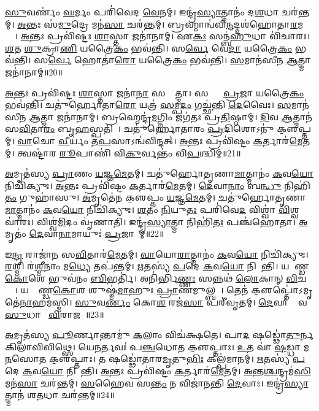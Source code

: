 \ul{𑌸𑍁}𑌵𑌰𑍍𑌣𑌂॑ \ul{𑌘}𑌰𑍍𑌮𑌂 𑌪𑌰𑌿॑𑌵𑍇𑌦 \ul{𑌵𑍇}𑌨𑌮𑍍। 
𑌇𑌨𑍍𑌦𑍍𑌰॑\ul{𑌸𑍍𑌯𑌾}𑌤𑍍𑌮𑌾𑌨𑌂॑ 𑌦\ul{𑌶}𑌧𑌾 𑌚𑌰॑𑌨𑍍𑌤𑌮𑍍। 
\ul{𑌅}𑌨𑍍𑌤𑌃 𑌸॑\ul{𑌮𑍁}𑌦𑍍𑌰𑍇 𑌮𑌨॑\ul{𑌸𑌾} 𑌚𑌰॑𑌨𑍍𑌤𑌮𑍍। 
𑌬𑍍𑌰𑌹𑍍𑌮𑌾𑌨𑍍𑌵॑𑌵𑌿\ul{𑌨𑍍𑌦}𑌦𑍍𑌦𑌶॑𑌹𑍋𑌤𑌾\ul{𑌰}𑌮𑌰𑍍𑌣𑍇᳚। 
\ul{𑌅}𑌨𑍍𑌤𑌃 𑌪𑍍𑌰𑌵𑌿॑𑌷𑍍𑌟𑌃  \ul{𑌶𑌾}𑌸𑍍𑌤𑌾 𑌜𑌨𑌾॑𑌨𑌾𑌮𑍍। 
𑌏\ul{𑌕𑌃} 𑌸𑌨𑍍𑌬॑\ul{𑌹𑍁}𑌧𑌾 𑌵𑌿॑𑌚𑌾𑌰𑌃। 
\ul{𑌶}𑌤 \ul{𑌶𑍁}𑌕𑍍𑌰𑌾\ul{𑌣𑌿} 𑌯𑌤𑍍𑌰𑍈\ul{𑌕𑌂} 𑌭𑌵॑𑌨𑍍𑌤𑌿। 
𑌸\ul{𑌰𑍍𑌵𑍇} 𑌵𑍇\ul{𑌦𑌾} 𑌯𑌤𑍍𑌰𑍈\ul{𑌕𑌂} 𑌭𑌵॑𑌨𑍍𑌤𑌿। 
𑌸\ul{𑌰𑍍𑌵𑍇} 𑌹𑍋𑌤𑌾॑\ul{𑌰𑍋} 𑌯𑌤𑍍𑌰𑍈\ul{𑌕𑌂} 𑌭𑌵॑𑌨𑍍𑌤𑌿। 
\ul{𑌸}𑌮𑌾𑌨॑𑌸𑍀𑌨 \ul{𑌆}𑌤𑍍𑌮𑌾 𑌜𑌨𑌾॑𑌨𑌾𑌮𑍍॥20॥%

\ul{𑌅}𑌨𑍍𑌤𑌃 𑌪𑍍𑌰𑌵𑌿॑𑌷𑍍𑌟𑌃  \ul{𑌶𑌾}𑌸𑍍𑌤𑌾 𑌜𑌨𑌾॑\ul{𑌨𑌾}\ul{} 𑌸𑌰𑍍𑌵𑌾᳚𑌤𑍍𑌮𑌾। 
𑌸𑌰𑍍𑌵𑌾𑌃᳚ \ul{𑌪𑍍𑌰}𑌜𑌾 𑌯𑌤𑍍𑌰𑍈\ul{𑌕𑌂} 𑌭𑌵॑𑌨𑍍𑌤𑌿। 
𑌚𑌤𑍁॑𑌰𑍍\mbox{}𑌹𑍋𑌤𑌾\ul{𑌰𑍋} 𑌯𑌤𑍍𑌰॑ \ul{𑌸}𑌮𑍍𑌪\ul{𑌦𑌂} 𑌗𑌚𑍍𑌛॑𑌨𑍍𑌤𑌿 \ul{𑌦𑍇}𑌵𑍈𑌃। 
\ul{𑌸}𑌮𑌾𑌨॑𑌸𑍀𑌨 \ul{𑌆}𑌤𑍍𑌮𑌾 𑌜𑌨𑌾॑𑌨𑌾𑌮𑍍। 
𑌬𑍍𑌰𑌹𑍍𑌮𑍇𑌨𑍍𑌦𑍍𑌰॑\ul{𑌮}𑌗𑍍𑌨𑌿𑌂 𑌜𑌗॑𑌤𑌃 𑌪𑍍𑌰\ul{𑌤𑌿}𑌷𑍍𑌠𑌾𑌮𑍍। 
\ul{𑌦𑌿}𑌵 \ul{𑌆}𑌤𑍍𑌮𑌾𑌨॑ 𑌸\ul{𑌵𑌿}𑌤𑌾\ul{𑌰𑌂} 𑌬𑍃\ul{𑌹}𑌸𑍍𑌪𑌤𑌿𑌮𑍍᳚। 
𑌚𑌤𑍁॑𑌰𑍍\mbox{}𑌹𑍋𑌤𑌾𑌰𑌂 \ul{𑌪𑍍𑌰}𑌦𑌿𑌶𑍋𑌽𑌨𑍁॑ 𑌕𑍢॒𑌪𑍍𑌤𑌮𑍍। 
\ul{𑌵𑌾}𑌚𑍋 \ul{𑌵𑍀}𑌰𑍍𑌯𑌂॑ 𑌤\ul{𑌪}𑌸𑌾𑌽𑌨𑍍𑌵॑𑌵𑌿𑌨𑍍𑌦𑌤𑍍। 
\ul{𑌅}𑌨𑍍𑌤𑌃 𑌪𑍍𑌰𑌵𑌿॑𑌷𑍍𑌟𑌂 \ul{𑌕}𑌰𑍍𑌤𑌾𑌰॑\ul{𑌮𑍇}𑌤𑌮𑍍। 
𑌤𑍍𑌵𑌷𑍍𑌟𑌾॑𑌰 \ul{𑌰𑍂}𑌪𑌾𑌣𑌿॑ 𑌵𑌿\ul{𑌕𑍁}𑌰𑍍𑌵𑌨𑍍𑌤𑌂॑ 𑌵𑌿\ul{𑌪}𑌶𑍍𑌚𑌿𑌮𑍍॥21॥

\ul{𑌅}𑌮𑍃𑌤॑𑌸𑍍𑌯 \ul{𑌪𑍍𑌰𑌾}𑌣𑌂 \ul{𑌯}𑌜𑍍𑌞\ul{𑌮𑍇}𑌤𑌮𑍍। 
𑌚𑌤𑍁॑𑌰𑍍\mbox{}𑌹𑍋𑌤𑍃𑌣𑌾\ul{𑌮𑌾}𑌤𑍍𑌮𑌾𑌨𑌂॑ \ul{𑌕}𑌵\ul{𑌯𑍋} 𑌨𑌿𑌚𑌿॑𑌕𑍍𑌯𑍁𑌃। 
\ul{𑌅}𑌨𑍍𑌤𑌃 𑌪𑍍𑌰𑌵𑌿॑𑌷𑍍𑌟𑌂 \ul{𑌕}𑌰𑍍𑌤𑌾𑌰॑\ul{𑌮𑍇}𑌤𑌮𑍍। 
\ul{𑌦𑍇}𑌵𑌾\ul{𑌨𑌾𑌂} 𑌬\ul{𑌨𑍍𑌧𑍁} 𑌨𑌿𑌹𑌿॑\ul{𑌤𑌂} 𑌗𑍁𑌹𑌾॑𑌸𑍁। 
\ul{𑌅}𑌮𑍃𑌤𑍇॑𑌨 𑌕𑍢॒𑌪𑍍𑌤𑌂 \ul{𑌯}𑌜𑍍𑌞\ul{𑌮𑍇}𑌤𑌮𑍍। 
𑌚𑌤𑍁॑𑌰𑍍\mbox{}𑌹𑍋𑌤𑍃𑌣𑌾\ul{𑌮𑌾}𑌤𑍍𑌮𑌾𑌨𑌂॑ \ul{𑌕}𑌵\ul{𑌯𑍋} 𑌨𑌿𑌚𑌿॑𑌕𑍍𑌯𑍁𑌃। 
\ul{𑌶}𑌤𑌂 \ul{𑌨𑌿}𑌯𑍁\ul{𑌤𑌃} 𑌪𑌰𑌿॑𑌵𑍇\ul{𑌦} 𑌵𑌿𑌶𑍍𑌵𑌾॑ \ul{𑌵𑌿}𑌶𑍍𑌵𑌵𑌾॑𑌰𑌃। 
𑌵𑌿𑌶𑍍𑌵॑\ul{𑌮𑌿}𑌦𑌂 𑌵𑍃॑𑌣𑌾𑌤𑌿। 
𑌇𑌨𑍍𑌦𑍍𑌰॑\ul{𑌸𑍍𑌯𑌾}𑌤𑍍𑌮𑌾 𑌨𑌿𑌹𑌿॑\ul{𑌤𑌃} 𑌪𑌞𑍍𑌚॑𑌹𑍋𑌤𑌾। 
\ul{𑌅}𑌮𑍃𑌤𑌂॑ \ul{𑌦𑍇}𑌵𑌾\ul{𑌨𑌾}𑌮𑌾𑌯𑍁𑌃॑ \ul{𑌪𑍍𑌰}𑌜𑌾𑌨𑌾᳚𑌮𑍍॥22॥%

𑌇\ul{𑌨𑍍𑌦𑍍𑌰}\ul{} 𑌰𑌾𑌜𑌾॑𑌨 𑌸\ul{𑌵𑌿}𑌤𑌾𑌰॑\ul{𑌮𑍇}𑌤𑌮𑍍। 
\ul{𑌵𑌾}𑌯𑍋\ul{𑌰𑌾}𑌤𑍍𑌮𑌾𑌨𑌂॑ \ul{𑌕}𑌵\ul{𑌯𑍋} 𑌨𑌿𑌚𑌿॑𑌕𑍍𑌯𑍁𑌃। 
\ul{𑌰}𑌶𑍍𑌮𑌿 𑌰॑\ul{𑌶𑍍𑌮𑍀}𑌨𑌾𑌂 𑌮\ul{𑌧𑍍𑌯𑍇} 𑌤𑌪॑𑌨𑍍𑌤𑌮𑍍। 
\ul{𑌋}𑌤𑌸𑍍𑌯॑ \ul{𑌪}𑌦𑍇 \ul{𑌕}𑌵\ul{𑌯𑍋} 𑌨𑌿𑌪𑌾᳚𑌨𑍍𑌤𑌿। 
𑌯 𑌆᳚𑌣𑍍𑌡\ul{𑌕𑍋}𑌶𑍇 𑌭𑍁𑌵॑𑌨𑌂 \ul{𑌬𑌿}𑌭𑌰𑍍𑌤𑌿॑। 
𑌅𑌨𑌿॑𑌰𑍍𑌭𑌿\ul{𑌣𑍍𑌣𑌃} 𑌸𑌨𑍍𑌨𑌥॑ \ul{𑌲𑍋}𑌕𑌾𑌨𑍍 \ul{𑌵𑌿}𑌚𑌷𑍍𑌟𑍇᳚। 
𑌯𑌸𑍍𑌯𑌾᳚𑌣𑍍𑌡\ul{𑌕𑍋}𑌶 𑌶𑍁𑌷𑍍𑌮॑\ul{𑌮𑌾}𑌹𑍁𑌃 \ul{𑌪𑍍𑌰𑌾}𑌣𑌮𑍁𑌲𑍍𑌬𑌮𑍍᳚। 
𑌤𑍇𑌨॑ 𑌕𑍢॒𑌪𑍍𑌤𑍋॑𑌽𑌮𑍃𑌤𑍇॑\ul{𑌨𑌾}𑌹𑌮॑𑌸𑍍𑌮𑌿। 
\ul{𑌸𑍁}𑌵\ul{𑌰𑍍𑌣𑌂} 𑌕𑍋\ul{𑌶}\ul{} 𑌰𑌜॑\ul{𑌸𑌾} 𑌪𑌰𑍀॑𑌵𑍃𑌤𑌮𑍍। 
\ul{𑌦𑍇}𑌵𑌾𑌨𑌾𑌂᳚ 𑌵\ul{𑌸𑍁}𑌧𑌾𑌨𑍀𑌂᳚  \ul{𑌵𑌿}𑌰𑌾𑌜𑌮𑍍᳚॥23॥%

\ul{𑌅}𑌮𑍃𑌤॑𑌸𑍍𑌯 \ul{𑌪𑍂}𑌰𑍍𑌣𑌾𑌨𑍍𑌤𑌾𑌮𑍁॑ \ul{𑌕}𑌲𑌾𑌂  𑌵𑌿𑌚॑𑌕𑍍𑌷𑌤𑍇। 
𑌪𑌾\ul{𑌦}\ul{} 𑌷𑌡𑍍𑌢𑍋॑\ul{𑌤𑍁}𑌰𑍍𑌨 𑌕𑌿𑌲𑌾॑𑌵𑌿𑌵𑌿𑌥𑍍𑌸𑍇। 
𑌯𑍇\ul{𑌨}𑌰𑍍𑌤𑌵𑌃॑ 𑌪\ul{𑌞𑍍𑌚}𑌧𑍋𑌤 𑌕𑍢॒𑌪𑍍𑌤𑌾𑌃। 
\ul{𑌉}𑌤 𑌵𑌾॑ \ul{𑌷}𑌡𑍍𑌧𑌾 𑌮\ul{𑌨}𑌸𑍋𑌤 𑌕𑍢॒𑌪𑍍𑌤𑌾𑌃। 
𑌤 𑌷𑌡𑍍𑌢𑍋॑𑌤𑌾𑌰\ul{𑌮𑍃}𑌤𑍁\ul{𑌭𑌿𑌃} 𑌕𑌲𑍍𑌪॑𑌮𑌾𑌨𑌮𑍍। 
\ul{𑌋}𑌤𑌸𑍍𑌯॑ \ul{𑌪}𑌦𑍇 \ul{𑌕}𑌵\ul{𑌯𑍋} 𑌨𑌿𑌪𑌾᳚𑌨𑍍𑌤𑌿। 
\ul{𑌅}𑌨𑍍𑌤𑌃 𑌪𑍍𑌰𑌵𑌿॑𑌷𑍍𑌟𑌂 \ul{𑌕}𑌰𑍍𑌤𑌾𑌰॑\ul{𑌮𑍇}𑌤𑌮𑍍। 
\ul{𑌅}𑌨𑍍𑌤\ul{𑌶𑍍𑌚}𑌨𑍍𑌦𑍍𑌰𑌮॑\ul{𑌸𑌿} 𑌮𑌨॑\ul{𑌸𑌾} 𑌚𑌰॑𑌨𑍍𑌤𑌮𑍍। 
\ul{𑌸}𑌹𑍈𑌵 𑌸\ul{𑌨𑍍𑌤𑌂} 𑌨 𑌵𑌿𑌜𑌾॑𑌨𑌨𑍍𑌤𑌿 \ul{𑌦𑍇}𑌵𑌾𑌃। 
𑌇𑌨𑍍𑌦𑍍𑌰॑\ul{𑌸𑍍𑌯𑌾}𑌤𑍍𑌮𑌾𑌨॑ 𑌶\ul{𑌤}𑌧𑌾 𑌚𑌰॑𑌨𑍍𑌤𑌮𑍍॥24॥%


